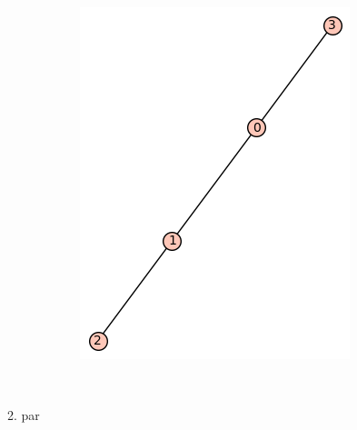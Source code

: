 \documentclass[12pt, a4paper]{article}
\begin{document}
\begin{figure}[h!]
\begin{subfigure}{0.5\textwidth}
\includegraphics[width=\linewidth]{t-3}
\end{subfigure} \\

\end{figure}

2. par
\end{document}
